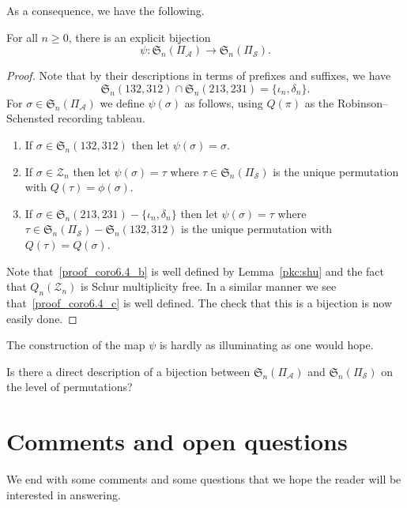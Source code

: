 \documentclass[ALCO,ThmDefs,Unicode,epreuves]{cedram}
\newcommand{\ra}{\rightarrow}
\newcommand{\de}{\delta}
\newcommand{\io}{\iota}
\newcommand{\si}{\sigma}
\newcommand{\cA}{{\mathcal A}}
\newcommand{\cS}{{\mathcal S}}
\newcommand{\cZ}{{\mathcal Z}}
\newcommand{\fS}{{\mathfrak S}}
\begin{document}
As a consequence, we have the following.
\begin{coro}
For all $n\ge0$, there is an explicit bijection
\[
\psi:\fS_n(\Pi_\cA)\ra\fS_n(\Pi_\cS).
\]
\end{coro}
\begin{proof}
Note that by their descriptions in terms of prefixes and suffixes, we have 
\[
\fS_n(132,312)\cap\fS_n(213,231)=\{\io_n,\de_n\}.
\]
For $\si\in\fS_n(\Pi_\cA)$ we define $\psi(\si)$ as follows, using $Q(\pi)$ as the Robinson--Schensted recording tableau.
\begin{enumerate}
\item\label{proof_coro6.4_a} %
If $\si\in\fS_n(132,312)$ then let $\psi(\si)=\si$.
\item\label{proof_coro6.4_b} %
If $\si\in\cZ_n$ then let $\psi(\si)=\tau$ where $\tau\in\fS_n(\Pi_\cS)$ is the unique permutation with $Q(\tau)=\phi(\si)$.
\item\label{proof_coro6.4_c} %
If $\si\in \fS_n(213,231)-\{\io_n,\de_n\}$ then let $\psi(\si)=\tau$ where $\tau\in\fS_n(\Pi_\cS)-\fS_n(132,312)$ is the unique permutation with $Q(\tau)=Q(\si)$.
\end{enumerate}
Note that~\eqref{proof_coro6.4_b} is well defined by Lemma~\ref{pkc:shu} and the fact that $Q_n(\cZ_n)$ is Schur multiplicity free.
In a similar manner we see that~\eqref{proof_coro6.4_c} is well defined. The check that this is a bijection is now easily done.
\end{proof}

The construction of the map $\psi$ is hardly as illuminating as one would hope.

\begin{question}
Is there a direct description of a bijection between $\fS_n(\Pi_\cA)$ and $\fS_n(\Pi_\cS)$ on the level of permutations?
\end{question}

\section{Comments and open questions}
\label{coq}

We end with some comments and some questions that we hope the reader will be interested in answering.

\end{document}
